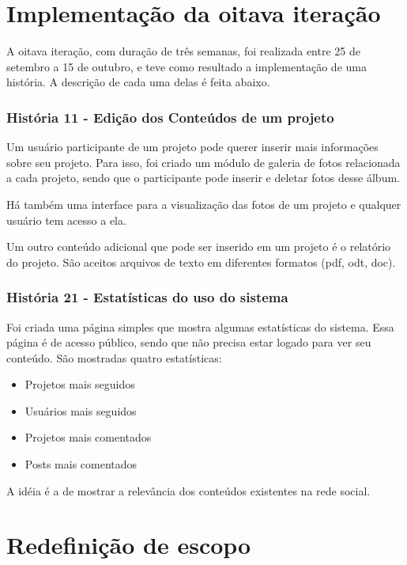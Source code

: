 \documentclass[a4paper,12pt,font=plain,header=plain]{abnt}
\begin{document}
 \section{Implementação da oitava iteração}
    A oitava iteração, com duração de três semanas, foi realizada entre 25 de setembro a 15 de outubro, e teve como resultado a implementação de uma história. A descrição de cada uma delas é feita abaixo. 

    \subsubsection{História 11 - Edição dos Conteúdos de um projeto}

      Um usuário participante de um projeto pode querer inserir mais informações sobre seu projeto. Para isso, foi criado um módulo de galeria de fotos relacionada a cada projeto, sendo que o participante pode inserir e deletar fotos desse álbum. 
      
      Há também uma interface para a visualização das fotos de um projeto e qualquer usuário tem acesso a ela.

      Um outro conteúdo adicional que pode ser inserido em um projeto é o relatório do projeto. São aceitos arquivos de texto em diferentes formatos (pdf, odt, doc).

    \subsubsection{História 21 - Estatísticas do uso do sistema}

        Foi criada uma página simples que mostra algumas estatísticas do sistema. Essa página é de acesso público, sendo que não precisa estar logado para ver seu conteúdo. São mostradas quatro estatísticas:
	\begin{itemize}
	  \item{
		Projetos mais seguidos
	  }
	  \item{
		Usuários mais seguidos
	  }
	  \item{ 
	    Projetos mais comentados 
	  }
	  \item{ 
	    Posts mais comentados
	  }
	\end{itemize}

        A idéia é a de mostrar a relevância dos conteúdos existentes na rede social.

 \section{Redefinição de escopo}
\end{document}
